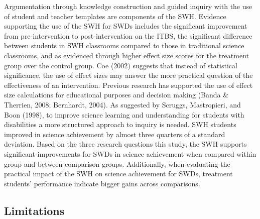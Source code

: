 \documentclass[11.5pt]{sig-alternate} %
\begin{document}
\begin{large}
Argumentation through knowledge construction and guided inquiry with the use of student and teacher templates are components of the SWH.  Evidence supporting the use of the SWH for SWDs includes the significant improvement from pre-intervention to post-intervention on the ITBS, the significant difference between students in SWH classrooms compared to those in traditional science classrooms, and as evidenced through higher effect size scores for the treatment group over the control group.  Coe (2002) suggests that instead of statistical significance, the use of effect sizes may answer the more practical question of the effectiveness of an intervention.  Previous research has supported the use of effect size calculations for educational purposes and decision making (Banda \& Therrien, 2008; Bernhardt, 2004).  As suggested by Scruggs, Mastropieri, and Boon (1998), to improve science learning and understanding for students with disabilities a more structured approach to inquiry is needed.  SWH students improved in science achievement by almost three quarters of a standard deviation.  Based on the three research questions this study, the SWH supports significant improvements for SWDs in science achievement when compared within group and between comparison groups.  Additionally, when evaluating the practical impact of the SWH on science achievement for SWDs, treatment students’ performance indicate bigger gains across comparisons.

\subsection*{Limitations}


\end{large}
\end{document}
